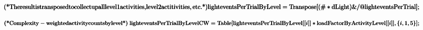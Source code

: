 \documentclass{article}
\begin{document}
\begin{doublespace}
\noindent\(\pmb{\text{(*} \text{The} \text{result} \text{is} \text{transposed} \text{to} \text{collect} \text{up} \text{all} \text{level} 1 \text{activities},
}\\
\pmb{\text{level} 2 \text{actitivities}, \text{etc}. \text{*)}}\\
\pmb{\text{lighteventsPerTrialByLevel} =\text{Transpose}[( \# * \text{dLight}) \& \text{/@} \text{lighteventsPerTrial}];}\)
\end{doublespace}

\begin{doublespace}
\noindent\(\pmb{\text{(*} \text{Complexity}-\text{weighted} \text{activity} \text{counts} \text{by} \text{level} \text{*)}}\\
\pmb{\text{lighteventsPerTrialByLevelCW} = }\\
\pmb{\text{Table}[\text{lighteventsPerTrialByLevel}[[i]] * \text{loadFactorByActivityLevel}[[i]], \{i, 1, 5\}];}\)
\end{doublespace}
\end{document}
